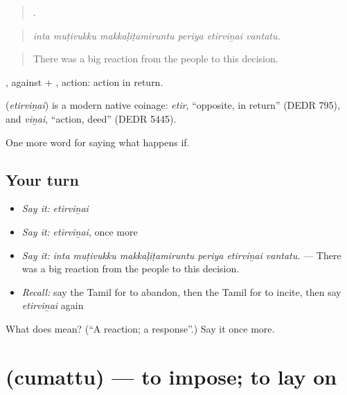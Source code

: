 \begin{quote}
     .
\end{quote}

\begin{quote}
\emph{inta muṭivukku makkaḷiṭamiruntu periya etirviṉai vantatu.}
\end{quote}

\begin{quote}
There was a big reaction from the people to this decision.
\end{quote}

, against + , action: action in return.

\begin{cousinweb}
\textbf{} (\emph{etirviṉai}) is a modern native coinage: \emph{etir}, \textquotedblleft{}opposite, in return\textquotedblright{} (DEDR 795), and \emph{viṉai}, \textquotedblleft{}action, deed\textquotedblright{} (DEDR 5445).
\end{cousinweb}

\begin{grammarlens}[title={What you've built}]
One more word for saying what happens if.
\end{grammarlens}

\subsection*{Your turn}
\begin{itemize}
\raggedright
  \item \emph{Say it:} \emph{etirviṉai}
  \item \emph{Say it:} \emph{etirviṉai}, once more
  \item \emph{Say it:} \emph{inta muṭivukku makkaḷiṭamiruntu periya etirviṉai vantatu.} — There was a big reaction from the people to this decision.
  \item \emph{Recall:} say the Tamil for to abandon, then the Tamil for to incite, then say \emph{etirviṉai} again
\end{itemize}

\begin{tcolorbox}[breakable,colback=teal!4,colframe=teal!35!black,title={Before you move on}]
What does  mean? (\textquotedblleft{}A reaction; a response\textquotedblright{}.) Say it once more.
\end{tcolorbox}
\section[\texorpdfstring{\ta{சுமத்து} (cumattu)}{சுமத்து (cumattu)}]{ (cumattu) — to impose; to lay on}

